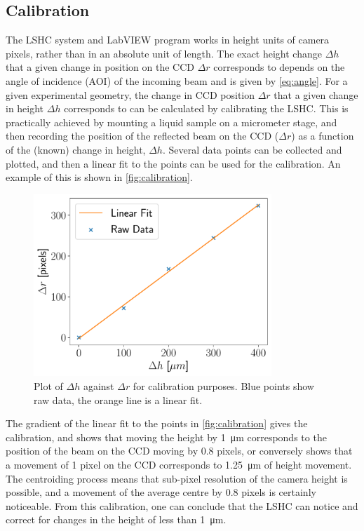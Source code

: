 \documentclass[11pt,a4paper,twoside]{article}
\begin{document}
\subsection{Calibration}
The LSHC system and LabVIEW program works in height units of camera pixels, rather than in an absolute unit of length. The exact height change $\Delta h$ that a given change in position on the CCD $\Delta r$ corresponds to depends on the angle of incidence (AOI) of the incoming beam and is given by \autoref{eq:angle}. For a given experimental geometry, the change in CCD position $\Delta r$ that a given change in height $\Delta h$ corresponds to can be calculated by calibrating the LSHC. This is practically achieved by mounting a liquid sample on a micrometer stage, and then recording the position of the reflected beam on the CCD ($\Delta r$) as a function of the (known) change in height, $\Delta h$. Several data points can be collected and plotted, and then a linear fit to the points can be used for the calibration. An example of this is shown in \autoref{fig:calibration}.

\begin{figure}
\centering
\includegraphics[width=0.8\textwidth]{calibration}
\caption{Plot of $\Delta h$ against $\Delta r$ for calibration purposes. Blue points show raw data, the orange line is a linear fit.}\label{fig:calibration}
\end{figure}

The gradient of the linear fit to the points in \autoref{fig:calibration} gives the calibration, and shows that moving the height by \SI{1}{\micro\metre} corresponds to the position of the beam on the CCD moving by 0.8 pixels, or conversely shows that a movement of 1 pixel on the CCD corresponds to \SI{1.25}{\micro\metre} of height movement. The centroiding process means that sub-pixel resolution of the camera height is possible, and a movement of the average centre by 0.8 pixels is certainly noticeable. From this calibration, one can conclude that the LSHC can notice and correct for changes in the height of less than \SI{1}{\micro\metre}. 
\end{document}
